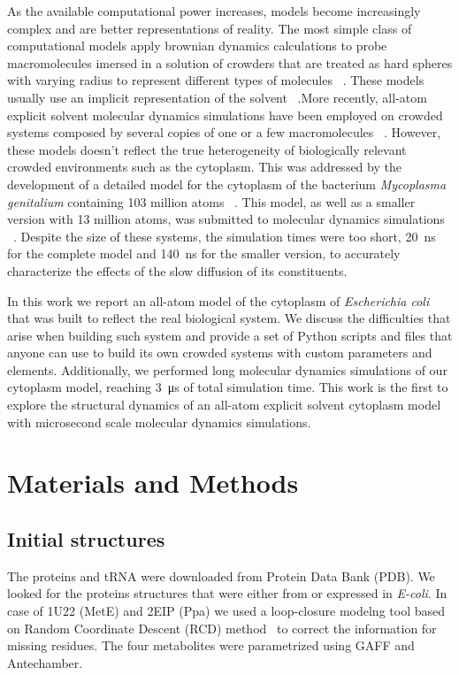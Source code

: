 \documentclass[journal=jacsat,manuscript=article]{achemso}
\begin{document}
As the available computational power increases, models become increasingly complex and are better representations of reality. The most simple class of computational models apply brownian dynamics calculations to probe macromolecules imersed in a solution of crowders that are treated as hard spheres with varying radius to represent different types of molecules ~\cite{ando2010crowding}. These models usually use an implicit representation of the solvent ~\cite{mcguffee2010diffusion}.More recently, all-atom explicit solvent molecular dynamics simulations have been employed on crowded systems composed by several copies of one or a few macromolecules ~\cite{wang2017influence}. However, these models doesn't reflect the true heterogeneity of biologically relevant crowded environments such as the cytoplasm. This was addressed by the development of a detailed model for the cytoplasm of the bacterium \textit{Mycoplasma genitalium} containing 103 million atoms ~\cite{feig2015complete}. This model, as well as a smaller version with 13 million atoms, was submitted to molecular dynamics simulations ~\cite{yu2016biomolecular}. Despite the size of these systems, the simulation times were too short, \SI{20}{\nano\second} for the complete model and \SI{140}{\nano\second} for the smaller version, to accurately characterize the effects of the slow diffusion of its constituents.

In this work we report an all-atom model of the cytoplasm of \textit{Escherichia coli} that was built to reflect the real biological system. We discuss the difficulties that arise when building such system and provide a set of Python scripts and files that anyone can use to build its own crowded systems with custom parameters and elements. Additionally, we performed long molecular dynamics simulations of our cytoplasm model, reaching \SI{3}{\micro\second} of total simulation time. This work is the first to explore the structural dynamics of an all-atom explicit solvent cytoplasm model with microsecond scale molecular dynamics simulations.



\section*{Materials and Methods}


\subsection*{Initial structures}
The proteins and tRNA were downloaded from Protein Data Bank (PDB). We looked for the proteins structures that were either from or expressed in {\em E-coli}. In case of 1U22 (MetE) and 2EIP (Ppa) we used a loop-closure modelng tool based on Random Coordinate Descent (RCD) method~\cite{Chys2013} to correct the information for missing residues. The four metabolites were parametrized using GAFF and Antechamber. 
\end{document}
